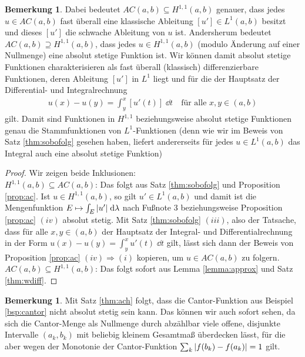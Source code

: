 \documentclass[twoside]{article}
\theoremstyle{definition}
\newtheorem{remark}[theorem]{Bemerkung}
\begin{document}
\begin{remark}
Dabei bedeutet $AC(a,b) \subseteq H^{1,1}(a,b)$ genauer, dass jedes $u \in AC(a,b)$ fast überall eine klassische Ableitung $[u'] \in L^1(a,b)$ besitzt und dieses $[u']$ die schwache Ableitung von $u$ ist. Andersherum bedeutet $AC(a,b) \supseteq H^{1,1}(a,b)$, dass jedes $u \in H^{1,1}(a,b)$ (modulo Änderung auf einer Nullmenge) eine absolut stetige Funktion ist. Wir können damit absolut stetige Funktionen charakterisieren als fast überall (klassisch) differenzierbare Funktionen, deren Ableitung $[u']$ in $L^1$ liegt und für die der Hauptsatz der Differential- und Integralrechnung 
\begin{align*}
u(x) -u(y) = \int_y^x [u'(t)] \; \dd t  \quad \text{für alle } x,y \in (a,b)
\end{align*}
gilt. Damit sind Funktionen in $H^{1,1}$ beziehungsweise absolut stetige Funktionen genau die Stammfunktionen von $L^1$-Funktionen (denn wie wir im Beweis von Satz \ref{thm:sobofolg} gesehen haben, liefert andererseits für jedes $u \in L^1(a,b)$ das Integral auch eine absolut stetige Funktion)
\end{remark}
\begin{proof} Wir zeigen beide Inklusionen:\\

$H^{1,1}(a,b) \subseteq AC(a,b)$: Das folgt aus Satz \ref{thm:sobofolg} und Proposition \ref{prop:ac}. Ist $u \in H^{1,1}(a,b)$, so gilt $u' \in L^1(a,b)$ und damit ist die Mengenfunktion $E \mapsto \int_E \abs{u'} \; \dd \lambda$ nach Fußnote 3 beziehungsweise Proposition \ref{prop:ac} $(iv)$ absolut stetig. Mit Satz \ref{thm:sobofolg} $(iii)$, also der Tatsache, dass für alle $x,y \in (a,b)$ der Hauptsatz der Integral- und Differentialrechnung in der Form $u(x)-u(y) = \int_y^x u'(t)\; \dd t$ gilt, lässt sich dann der Beweis von Proposition \ref{prop:ac} $(iv) \Rightarrow (i)$ kopieren, um $u \in AC(a,b)$ zu folgern.\\

$AC(a,b) \subseteq H^{1,1}(a,b)$: Das folgt sofort aus Lemma \ref{lemma:approx} und Satz \ref{thm:wdiff}. 
\end{proof}
\begin{remark}
Mit Satz \ref{thm:ach} folgt, dass die Cantor-Funktion aus Beispiel \ref{bsp:cantor} nicht absolut stetig sein kann. Das können wir auch sofort sehen, da sich die Cantor-Menge als Nullmenge durch abzählbar viele offene, disjunkte Intervalle $(a_k, b_k)$ mit beliebig kleinem Gesamtmaß überdecken lässt, für die aber wegen der Monotonie der Cantor-Funktion $\sum_k \abs{f(b_k) - f(a_k)} = 1$ gilt. 
\end{remark}
\end{document}
